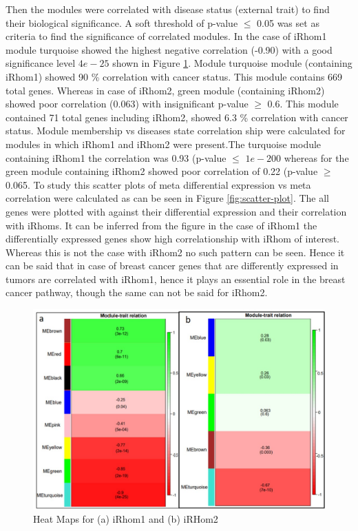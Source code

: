\documentclass[fleqn,10pt,lineno]{wlpeerj}
\begin{document}
Then the modules were correlated with disease status (external trait) to find their biological significance. A soft threshold of p-value $\leq$ 0.05 was set as criteria to find the significance of correlated modules. In the case of iRhom1 module turquoise showed the highest negative correlation (-0.90) with a good significance level $ 4 e-25$ shown in Figure \ref{fig:mod-trait}. Module turquoise module (containing iRhom1) showed 90 \% correlation with cancer status. This module contains 669 total genes. Whereas in case of iRhom2, green module (containing iRhom2) showed poor correlation (0.063) with insignificant p-value  $\geq$ 0.6. This module contained 71 total genes including iRhom2, showed 6.3 \% correlation with cancer status. Module membership vs diseases state correlation ship were calculated for modules in which iRhom1 and iRhom2 were present.The turquoise module containing iRhom1 the correlation was 0.93 (p-value $\leq$ $1 e -200$ whereas for the green module containing iRhom2 showed poor correlation of 0.22 (p-value $\geq$ 0.065. To study this scatter plots of meta differential expression vs meta correlation were calculated as can be seen in Figure \ref{fig:scatter-plot}. The all genes were plotted with against their differential expression and their correlation with iRhoms. It can be inferred from the figure in the case of iRhom1 the differentially expressed genes show high correlationship with iRhom of interest. Whereas this is not the case with iRhom2 no such pattern can be seen. Hence it can be said that in case of breast cancer genes  that are differently expressed in tumors are correlated with iRhom1, hence it plays an essential role in the breast cancer pathway, though the same can not be said for iRhom2.    
\begin{figure}[ht]
\centering
\includegraphics[width=\linewidth]{mod-trait.jpg}
\caption{Heat Maps for (a) iRhom1 and (b) iRHom2}
\label{fig:mod-trait}
\end{figure}
\end{document}
